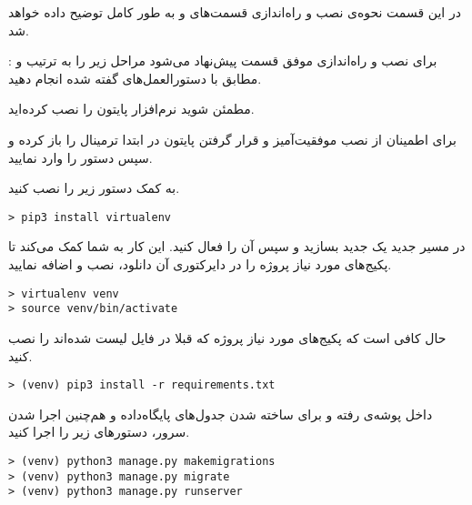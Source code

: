 
در این قسمت نحوه‌ی نصب و راه‌اندازی قسمت‌های  و  به طور کامل توضیح داده خواهد شد.

	 : برای نصب و راه‌اندازی موفق قسمت  پیش‌نهاد می‌شود مراحل زیر را به ترتیب و مطابق با دستورالعمل‌های گفته شده انجام دهید.
	
		 مطمئن شوید نرم‌افزار پایتون را نصب کرده‌اید.
		
		 برای اطمینان از نصب موفقیت‌آمیز و قرار گرفتن پایتون در  ابتدا ترمینال را باز کرده و سپس دستور  را وارد نمایید.
		
		
		 به کمک دستور زیر  را نصب کنید.
		
		\begin{latin}
			\begin{verbatim}
> pip3 install virtualenv
			\end{verbatim}
		\end{latin}
	
	 در مسیر جدید یک  جدید بسازید و سپس آن را فعال کنید. این کار به شما کمک می‌کند تا پکیج‌های مورد نیاز پروژه را در دایرکتوری آن دانلود، نصب و اضافه نمایید.
		\begin{latin}
			\begin{verbatim}
> virtualenv venv
> source venv/bin/activate
			\end{verbatim}
		\end{latin}
	 حال کافی است که پکیج‌های مورد نیاز پروژه که قبلا در فایل  لیست شده‌اند را نصب کنید.
		\begin{latin}
			\begin{verbatim}
> (venv) pip3 install -r requirements.txt
			\end{verbatim}
		\end{latin}
	 داخل پوشه‌ی  رفته و برای ساخته شدن جدول‌های پایگاه‌داده و هم‌چنین اجرا شدن سرور، دستورهای زیر را اجرا کنید.
		\begin{latin}
			\begin{verbatim}
> (venv) python3 manage.py makemigrations
> (venv) python3 manage.py migrate
> (venv) python3 manage.py runserver
			\end{verbatim}
		\end{latin}
	

	
